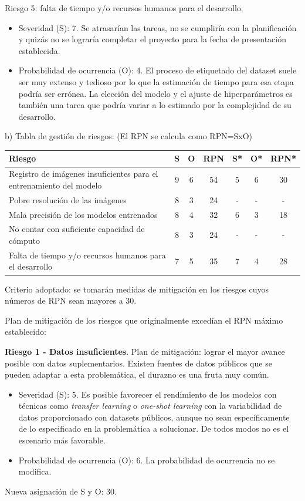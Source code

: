 \documentclass[
11pt %
]{charter}
\begin{document}
Riesgo 5: falta de tiempo y/o recursos humanos para el desarrollo.
\begin{itemize}
	\item Severidad (S): 7. Se atrasarían las tareas, no se cumpliría con la planificación y quizás no se lograría completar el proyecto para la fecha de presentación establecida.
	\item Probabilidad de ocurrencia (O): 4. El proceso de etiquetado del dataset suele ser muy extenso y tedioso por lo que la estimación de tiempo para esa etapa podría ser errónea. La elección del modelo y el ajuste de hiperparámetros es también una tarea que podría variar a lo estimado por la complejidad de su desarrollo.
\end{itemize}

b) Tabla de gestión de riesgos: (El RPN se calcula como RPN=SxO)

\begin{table}[htpb]
\centering
\begin{tabularx}{\linewidth}{@{}|X|c|c|c|c|c|c|@{}}
\hline
\rowcolor[HTML]{C0C0C0} 
Riesgo & S & O & RPN & S* & O* & RPN* \\ \hline
Registro de imágenes insuficientes para el entrenamiento del modelo & 9 & 6 & 54 & 5 & 6 & 30 \\ \hline
Pobre resolución de las imágenes & 8 & 3 & 24 & - & - & - \\ \hline
Mala precisión de los modelos entrenados & 8 & 4 & 32 & 6 & 3 & 18 \\ \hline
No contar con suficiente capacidad de cómputo & 8 & 3 & 24 & - & - & - \\ \hline
Falta de tiempo y/o recursos humanos para el desarrollo & 7 & 5 & 35 & 7 & 4 & 28 \\ \hline
\end{tabularx}%
\end{table}

Criterio adoptado: se tomarán medidas de mitigación en los riesgos cuyos números de RPN sean mayores a 30.


Plan de mitigación de los riesgos que originalmente excedían el RPN máximo establecido:

\textbf{Riesgo 1 - Datos insuficientes}. Plan de mitigación: lograr el mayor avance posible con datos suplementarios. Existen fuentes de datos públicos que se pueden adaptar a esta problemática, el durazno es una fruta muy común.
\begin{itemize}
	\item Severidad (S): 5. Es posible favorecer el rendimiento de los modelos con técnicas como \textit{transfer learning} o \textit{one-shot learning} con la variabilidad de datos proporcionado con datasets públicos, aunque no sean específicamente de lo especificado en la problemática a solucionar. De todos modos no es el escenario más favorable.
	\item Probabilidad de ocurrencia (O): 6. La probabilidad de ocurrencia no se modifica.
\end{itemize}
Nueva asignación de S y O: 30.
\end{document}
